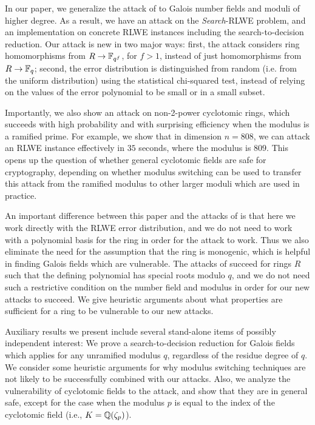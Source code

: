 \documentclass[envcountsame]{llncs}
\begin{document}
In our paper, we generalize the attack of \cite{elos2015weak} to Galois number fields and moduli of higher degree. As a result, we have an attack on the {\it Search}-RLWE problem, and an implementation on concrete RLWE instances including the search-to-decision reduction.  Our attack is new in two major ways: first, the attack considers ring homomorphisms from $R \to \mathbb{F}_{q^f}$, for $f>1$, instead of just homomorphisms from $R \to \mathbb{F}_q$; second, the error distribution is distinguished from random (i.e. from the uniform distribution) using the statistical chi-squared test, instead of relying on the values of the error polynomial to be small or in a small subset.

Importantly, we also show an attack on non-2-power cyclotomic rings, 
which succeeds with high probability and with surprising efficiency when the modulus is a ramified prime.  For example, we show that in dimension $n=808$, we can attack an RLWE instance effectively in $35$ seconds, where the modulus is $809$.  This opens up the question of whether general cyclotomic fields are safe for cryptography, depending on whether modulus switching can be used to transfer this attack from the ramified modulus to other larger moduli which are used in practice.

An important difference between this paper and the attacks of \cite{elos2015weak} is that here we work directly with the RLWE error distribution, and we do not need to work with a polynomial basis for the ring in order for the attack to work.  Thus we also eliminate the need for the assumption that the ring is monogenic, which is helpful in finding Galois fields which are vulnerable.  The attacks of \cite{elos2015weak} succeed for rings $R$ such that the defining polynomial has special roots modulo $q$, and we do not need such a restrictive condition on the number field and modulus in order for our new attacks to succeed.  We give heuristic arguments about what properties are sufficient for a ring to be vulnerable to our new attacks.

 Auxiliary results we present include several stand-alone items of possibly independent interest:
 We prove a search-to-decision reduction  for Galois fields which applies for any unramified modulus $q$, regardless of the residue degree of $q$.  We consider some heuristic arguments for why modulus switching techniques are not likely to be successfully combined with our attacks.
Also, we analyze the vulnerability of cyclotomic fields to the \cite{elos2015weak} attack, and show that they are in general safe, except for the case when the modulus $p$ is equal to the index of the cyclotomic field (i.e., $K = \mathbb{Q}(\zeta_p)$).
\end{document}
